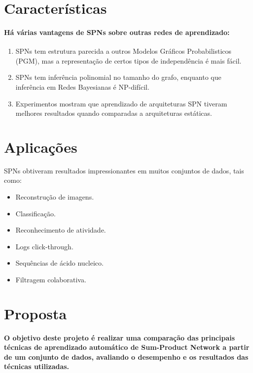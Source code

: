 \documentclass[a4paper,10pt]{article}
\theoremstyle{plain}
\begin{document}
\section{Características}

\paragraph{
  Há várias vantagens de SPNs sobre outras redes de aprendizado:
}

\begin{enumerate} \itemsep0pt
  \item SPNs tem estrutura parecida a outros Modelos Gráficos Probabilisticos (PGM), mas a 
    representação de certos tipos de independência é mais fácil.
  \item SPNs tem inferência polinomial no tamanho do grafo, enquanto que inferência em Redes Bayesianas
    é NP-difícil.
  \item Experimentos mostram que aprendizado de arquiteturas SPN tiveram melhores resultados quando
    comparadas a arquiteturas estáticas.\cite{clustering}
\end{enumerate}

\section{Aplicações}

SPNs obtiveram resultados impressionantes em muitos conjuntos de dados\cite{website:spn-uwashington}, tais como:

\begin{itemize} \itemsep0pt
  \item Reconstrução de imagens.
  \item Classificação.
  \item Reconhecimento de atividade.
  \item Logs click-through.
  \item Sequências de ácido nucleico.
  \item Filtragem colaborativa.
\end{itemize}

\section{Proposta}

\paragraph{
  O objetivo deste projeto é realizar uma comparação das principais técnicas de aprendizado 
automático de Sum-Product Network a partir de um conjunto de dados, avaliando o desempenho 
e os resultados das técnicas utilizadas.
}
\end{document}
